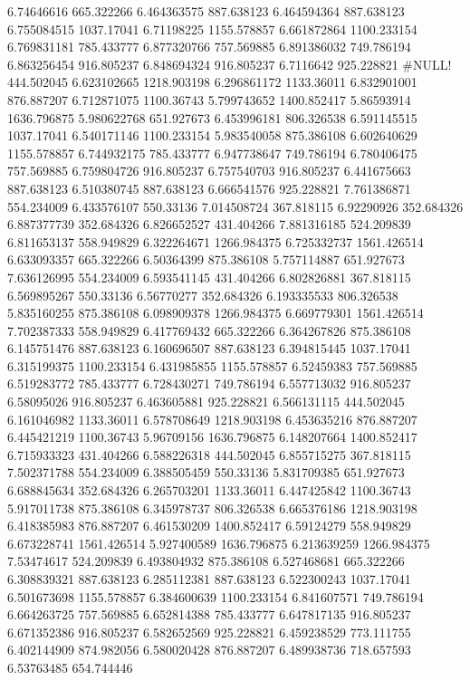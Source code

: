 6.74646616	665.322266
6.464363575	887.638123
6.464594364	887.638123
6.755084515	1037.17041
6.71198225	1155.578857
6.661872864	1100.233154
6.769831181	785.433777
6.877320766	757.569885
6.891386032	749.786194
6.863256454	916.805237
6.848694324	916.805237
6.7116642	925.228821
#NULL!	444.502045
6.623102665	1218.903198
6.296861172	1133.36011
6.832901001	876.887207
6.712871075	1100.36743
5.799743652	1400.852417
5.86593914	1636.796875
5.980622768	651.927673
6.453996181	806.326538
6.591145515	1037.17041
6.540171146	1100.233154
5.983540058	875.386108
6.602640629	1155.578857
6.744932175	785.433777
6.947738647	749.786194
6.780406475	757.569885
6.759804726	916.805237
6.757540703	916.805237
6.441675663	887.638123
6.510380745	887.638123
6.666541576	925.228821
7.761386871	554.234009
6.433576107	550.33136
7.014508724	367.818115
6.92290926	352.684326
6.887377739	352.684326
6.826652527	431.404266
7.881316185	524.209839
6.811653137	558.949829
6.322264671	1266.984375
6.725332737	1561.426514
6.633093357	665.322266
6.50364399	875.386108
5.757114887	651.927673
7.636126995	554.234009
6.593541145	431.404266
6.802826881	367.818115
6.569895267	550.33136
6.56770277	352.684326
6.193335533	806.326538
5.835160255	875.386108
6.098909378	1266.984375
6.669779301	1561.426514
7.702387333	558.949829
6.417769432	665.322266
6.364267826	875.386108
6.145751476	887.638123
6.160696507	887.638123
6.394815445	1037.17041
6.315199375	1100.233154
6.431985855	1155.578857
6.52459383	757.569885
6.519283772	785.433777
6.728430271	749.786194
6.557713032	916.805237
6.58095026	916.805237
6.463605881	925.228821
6.566131115	444.502045
6.161046982	1133.36011
6.578708649	1218.903198
6.453635216	876.887207
6.445421219	1100.36743
5.96709156	1636.796875
6.148207664	1400.852417
6.715933323	431.404266
6.588226318	444.502045
6.855715275	367.818115
7.502371788	554.234009
6.388505459	550.33136
5.831709385	651.927673
6.688845634	352.684326
6.265703201	1133.36011
6.447425842	1100.36743
5.917011738	875.386108
6.345978737	806.326538
6.665376186	1218.903198
6.418385983	876.887207
6.461530209	1400.852417
6.59124279	558.949829
6.673228741	1561.426514
5.927400589	1636.796875
6.213639259	1266.984375
7.53474617	524.209839
6.493804932	875.386108
6.527468681	665.322266
6.308839321	887.638123
6.285112381	887.638123
6.522300243	1037.17041
6.501673698	1155.578857
6.384600639	1100.233154
6.841607571	749.786194
6.664263725	757.569885
6.652814388	785.433777
6.647817135	916.805237
6.671352386	916.805237
6.582652569	925.228821
6.459238529	773.111755
6.402144909	874.982056
6.580020428	876.887207
6.489938736	718.657593
6.53763485	654.744446
